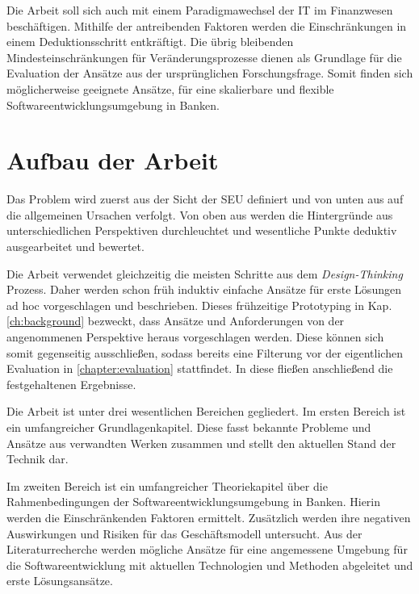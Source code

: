 Die Arbeit soll sich auch mit einem Paradigmawechsel der IT im Finanzwesen beschäftigen. Mithilfe der antreibenden Faktoren werden die Einschränkungen in einem Deduktionsschritt entkräftigt. Die übrig bleibenden Mindesteinschränkungen für Veränderungsprozesse dienen als Grundlage für die Evaluation der Ansätze aus der ursprünglichen Forschungsfrage. Somit finden sich möglicherweise geeignete Ansätze, für eine skalierbare und flexible Softwareentwicklungsumgebung in Banken.


%
%
\section{Aufbau der Arbeit}
\label{sec:intro:structure}
Das Problem wird zuerst aus der Sicht der \ac{SEU} definiert und von unten aus auf die allgemeinen Ursachen verfolgt. Von oben aus werden die Hintergründe aus unterschiedlichen Perspektiven durchleuchtet und wesentliche Punkte deduktiv ausgearbeitet und bewertet.

Die Arbeit verwendet gleichzeitig die meisten Schritte aus dem \emph{Design-Thinking} Prozess. Daher werden schon früh induktiv einfache Ansätze für erste Lösungen ad hoc vorgeschlagen und beschrieben. Dieses frühzeitige Prototyping in Kap. \ref{ch:background} bezweckt, dass Ansätze und Anforderungen von der angenommenen Perspektive heraus vorgeschlagen werden. Diese können sich somit gegenseitig ausschließen, sodass bereits eine Filterung vor der eigentlichen Evaluation in \ref{chapter:evaluation} stattfindet. In diese fließen anschließend die festgehaltenen Ergebnisse.

Die Arbeit ist unter drei wesentlichen Bereichen gegliedert. 
Im ersten Bereich ist ein umfangreicher Grundlagenkapitel. Diese fasst bekannte Probleme und Ansätze aus verwandten Werken zusammen und stellt den aktuellen Stand der Technik dar. 

Im zweiten Bereich ist ein umfangreicher Theoriekapitel über die Rahmenbedingungen der Softwareentwicklungsumgebung in Banken. Hierin werden die Einschränkenden Faktoren ermittelt. Zusätzlich werden ihre negativen Auswirkungen und Risiken für das Geschäftsmodell untersucht. Aus der Literaturrecherche werden mögliche Ansätze für eine angemessene Umgebung für die Softwareentwicklung mit aktuellen Technologien und Methoden abgeleitet und erste Lösungsansätze. 


